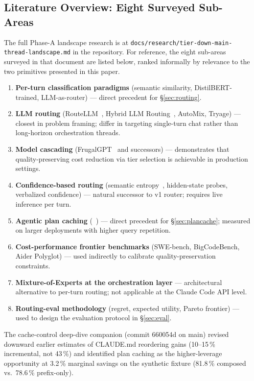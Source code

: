 \subsection{Literature Overview: Eight Surveyed Sub-Areas}
\label{sec:landscape}

The full Phase-A landscape research is at
\texttt{docs/research/tier-down-main-thread-landscape.md} in the \blackrim
repository. For reference, the eight sub-areas surveyed in that document
are listed below, ranked informally by relevance to the two primitives
presented in this paper.

\begin{enumerate}
  \item \textbf{Per-turn classification paradigms}
        (semantic similarity, DistilBERT-trained, LLM-as-router) ---
        direct precedent for §\ref{sec:routing}.
  \item \textbf{LLM routing}
        (RouteLLM~\cite{routellm}, Hybrid LLM Routing~\cite{hybridllm},
        AutoMix, Tryage) ---
        closest in problem framing; differ in targeting
        single-turn chat rather than long-horizon orchestration threads.
  \item \textbf{Model cascading}
        (FrugalGPT~\cite{frugalgpt} and successors) ---
        demonstrates that quality-preserving cost reduction via
        tier selection is achievable in production settings.
  \item \textbf{Confidence-based routing}
        (semantic entropy~\cite{semanticentropy}, hidden-state probes,
        verbalized confidence) ---
        natural successor to v1 router; requires live inference per turn.
  \item \textbf{Agentic plan caching}
        (\citeauthor{plancache}~\cite{plancache}) ---
        direct precedent for §\ref{sec:plancache}; measured on
        larger deployments with higher query repetition.
  \item \textbf{Cost-performance frontier benchmarks}
        (SWE-bench, BigCodeBench, Aider Polyglot) ---
        used indirectly to calibrate quality-preservation constraints.
  \item \textbf{Mixture-of-Experts at the orchestration layer} ---
        architectural alternative to per-turn routing;
        not applicable at the Claude Code API level.
  \item \textbf{Routing-eval methodology}
        (regret, expected utility, Pareto frontier) ---
        used to design the evaluation protocol in §\ref{sec:eval}.
\end{enumerate}

The cache-control deep-dive companion (commit 660054d on \blackrim main)
revised downward earlier estimates of CLAUDE.md reordering gains
(10--15\,\% incremental, not 43\,\%) and identified plan caching
as the higher-leverage opportunity at 3.2\,\% marginal savings on
the synthetic fixture (81.8\,\% composed vs.\ 78.6\,\% prefix-only).
